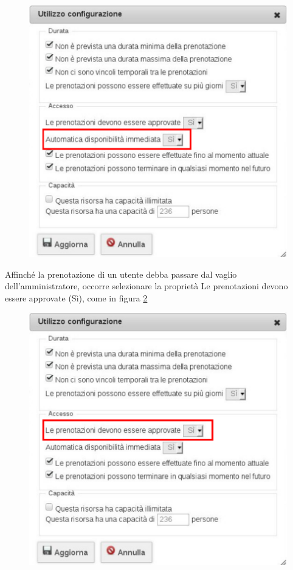 \begin{figure}[H]
\centering{}\includegraphics[scale=0.7]{Immagini/risorsa_configurazione_proprieta_disponibilita.pdf}
\normalsize
\caption{}
\label{fig:risorsa_configurazione_proprieta_disponibilita.pdf}
\end{figure}

Affinché la prenotazione di un utente debba passare dal vaglio dell'amministratore,
occorre selezionare la proprietà
Le prenotazioni devono essere approvate (Sì), come in figura
\ref{fig:risorsa_configurazione_proprieta_approvazione.pdf}

\begin{figure}[H]
\centering{}\includegraphics[scale=0.7]{Immagini/risorsa_configurazione_proprieta_approvazione.pdf}
\normalsize
\caption{}
\label{fig:risorsa_configurazione_proprieta_approvazione.pdf}
\end{figure}

